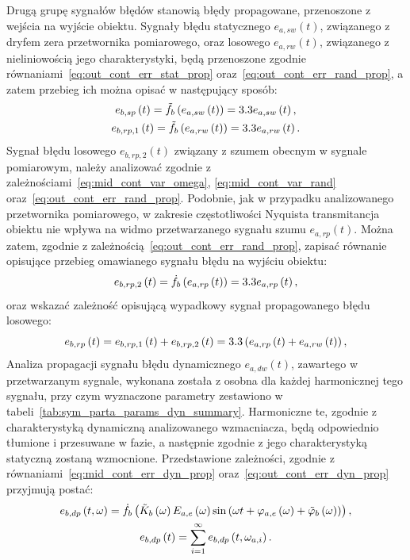 Drugą grupę sygnałów błędów stanowią błędy propagowane, przenoszone z wejścia na wyjście obiektu. Sygnały błędu statycznego $e_{a,sw}(t)$, związanego z dryfem zera przetwornika pomiarowego, oraz losowego $e_{a,rw}(t)$, związanego z nieliniowością jego charakterystyki, będą przenoszone zgodnie równaniami~\eqref{eq:out_cont_err_stat_prop} oraz~\eqref{eq:out_cont_err_rand_prop}, a zatem przebieg ich można opisać w następujący sposób:
\begin{gather}
e_{b,sp} \left(t\right) = \tilde{f}_{b} \left( e_{a,sw} \left(t\right) \right) = 3.3 e_{a,sw} \left(t\right) \label{eq:sym_partb_stat_prop_err}, \\
e_{b,rp,1} \left(t\right) = \tilde{f}_{b} \left( e_{a,rw} \left(t\right) \right) = 3.3 e_{a,rw} \left(t\right) \label{eq:sym_partb_rand_prop_err_1}.
\end{gather}
Sygnał błędu losowego $e_{b,rp,2}(t)$ związany z szumem obecnym w sygnale pomiarowym, należy analizować zgodnie z zależnościami~\eqref{eq:mid_cont_var_omega}, \eqref{eq:mid_cont_var_rand} oraz~\eqref{eq:out_cont_err_rand_prop}. Podobnie, jak w przypadku analizowanego przetwornika pomiarowego, w zakresie częstotliwości Nyquista transmitancja obiektu nie wpływa na widmo przetwarzanego sygnału szumu $e_{a,rp}(t)$. Można zatem, zgodnie z zależnością~\eqref{eq:out_cont_err_rand_prop}, zapisać równanie opisujące przebieg omawianego sygnału błędu na wyjściu obiektu:
\begin{equation}
e_{b,rp,2} \left(t\right) = \dot{f}_{b} \left( e_{a,rp} \left(t\right) \right) = 3.3 e_{a,rp} \left(t\right) \label{eq:sym_partb_rand_prop_err_2},
\end{equation}
oraz wskazać zależność opisującą wypadkowy sygnał propagowanego błędu losowego:
\begin{equation}
e_{b,rp} \left(t\right) = e_{b,rp,1} \left(t\right) + e_{b,rp,2} \left(t\right) = 3.3 \left( e_{a,rp} \left(t\right) + e_{a,rw} \left(t\right) \right) \label{eq:sym_partb_rand_prop_err},
\end{equation}
Analiza propagacji sygnału błędu dynamicznego $e_{a,dw}(t)$, zawartego w przetwarzanym sygnale, wykonana została z osobna dla każdej harmonicznej tego sygnału, przy czym wyznaczone parametry zestawiono w tabeli~\ref{tab:sym_parta_params_dyn_summary}. Harmoniczne te, zgodnie z charakterystyką dynamiczną analizowanego wzmacniacza, będą odpowiednio tłumione i przesuwane w fazie, a następnie zgodnie z jego charakterystyką statyczną zostaną wzmocnione. Przedstawione zależności, zgodnie z równaniami~\eqref{eq:mid_cont_err_dyn_prop} oraz~\eqref{eq:out_cont_err_dyn_prop} przyjmują postać:
\begin{gather}
e_{b,dp} \left(t,\omega\right) = \dot{f}_{b} \left( \tilde{K}_{b} \left(\omega\right) E_{a,e} \left(\omega\right) \sin \left( \omega t + \varphi_{a,e} \left(\omega\right) + \tilde{\varphi}_{b} \left(\omega\right) \right) \right) \label{eq:sym_partb_dyn_prop_err},\\
e_{b,dp} \left(t\right) = \sum _{i = 1} ^{\infty} e_{b,dp} \left(t,\omega_{a,i}\right) \label{eq:sym_partb_dyn_prop_sum}.
\end{gather}

